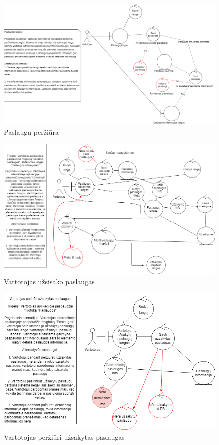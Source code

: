 \documentclass[oneside]{VUMIFPSkursinis}
\begin{document}
			\begin{figure}[h]
    				\centering
    				\includegraphics[width=1\textwidth]{rob4.png}
    				\caption{Paslaugų peržiūra}
    				\label{fig:Paslaugų peržiūra}
			\end{figure}

			\begin{figure}[h]
    				\centering
    				\includegraphics[width=1\textwidth]{rob6.png}
    				\caption{Vartotojas užsisako paslaugas}
    				\label{fig:Vartotojas užsisako paslaugas}
			\end{figure}

			\begin{figure}[h]
    				\centering
    				\includegraphics[width=1\textwidth]{rob7.png}
    				\caption{Vartotojas peržiūri užsakytas paslaugas}
    				\label{fig:Vartotojas peržiūri užsakytas paslaugas}
			\end{figure}
\end{document}
